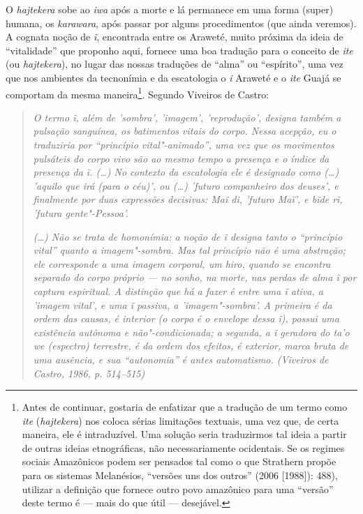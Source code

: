 O \emph{hajtekera} sobe ao \emph{iwa} após a morte e lá permanece em uma
forma (super) humana, os \emph{karawara}, após passar por alguns
procedimentos (que ainda veremos). A cognata noção de \emph{ĩ},
encontrada entre os Araweté, muito próxima da ideia de ``vitalidade'' que
proponho aqui, fornece uma boa tradução para o conceito de \emph{ite}
(ou \emph{hajtekera}), no lugar das nossas traduções de ``alma'' ou
``espírito'', uma vez que nos ambientes da tecnonímia e da escatologia o
\emph{i} Araweté e o \emph{ite} Guajá se comportam da mesma
maneira\footnote{Antes de continuar, gostaria de enfatizar que a
  tradução de um termo como \emph{ite} (\emph{hajtekera}) nos coloca
  sérias limitações textuais, uma vez que, de certa maneira, ele é
  intraduzível. Uma solução seria traduzirmos tal ideia a partir de
  outras ideias etnográficas, não necessariamente ocidentais. Se os
  regimes sociais Amazônicos podem ser pensados tal como o que Strathern
  propõe para os sistemas Melanésios, ``versões uns dos outros'' (2006
  {[}1988{]}): 488), utilizar a definição que fornece outro povo
  amazônico para uma ``versão'' deste termo é --- mais do que útil ---
  desejável.}. Segundo Viveiros de Castro:

\begin{quote}
\emph{O termo \emph{ĩ}, além de 'sombra', 'imagem', 'reprodução', designa
também a pulsação sanguínea, os batimentos vitais do corpo. Nessa
acepção, eu o traduziria por ``princípio vital"-animado'', uma vez que os
movimentos pulsáteis do corpo vivo são ao mesmo tempo a presença e o
índice da presença da \emph{ĩ}. (\ldots{}) No contexto da escatologia ele é
designado como (\ldots{}) 'aquilo que irá (para o céu)', ou (\ldots{}) 'futuro
companheiro dos deuses', e finalmente por duas expressões decisivas:
\emph{Maï di}, 'futuro Maï', e \emph{bïde rĩ}, 'futura gente"-Pessoa'.}

\noindent\emph{(\ldots{}) Não se trata de homonímia: a noção de \emph{ĩ} designa tanto o
``princípio vital'' quanto a imagem"-sombra. Mas tal princípio não é uma
abstração; ele corresponde a uma imagem corporal, um \emph{hiro}, quando
se encontra separado do corpo próprio --- no sonho, na morte, nas perdas
de alma \emph{ĩ} por captura espiritual. A distinção que há a fazer é
entre uma \emph{ĩ} {ativa}, a 'imagem vital', e uma \emph{ĩ} {passiva},
a 'imagem"-sombra'. A primeira é da ordem das causas, é {interior} (o
corpo é o envelope dessa \emph{ĩ}), possui uma existência autônoma e
não"-condicionada; a segunda, a \emph{ĩ} geradora do \emph{ta'o we}
(espectro) terrestre, é da ordem dos efeitos, é exterior, marca bruta de
uma ausência, e sua ``autonomia'' é antes automatismo. (Viveiros de
Castro, 1986, p. 514--515)}
\end{quote}

